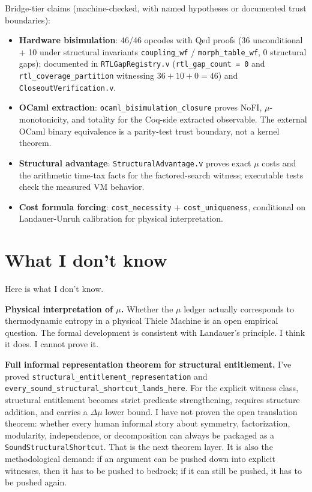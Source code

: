 \documentclass[11pt,a4paper]{article}
\theoremstyle{plain}
\theoremstyle{definition}
\theoremstyle{remark}
\begin{document}
Bridge-tier claims (machine-checked, with named hypotheses or documented trust boundaries):
\begin{itemize}
\item \textbf{Hardware bisimulation}: 46/46 opcodes with Qed proofs (36 unconditional + 10 under structural invariants \texttt{coupling\_wf} / \texttt{morph\_table\_wf}, 0 structural gaps); documented in \texttt{RTLGapRegistry.v} (\texttt{rtl\_gap\_count = 0} and \texttt{rtl\_coverage\_partition} witnessing $36 + 10 + 0 = 46$) and \texttt{CloseoutVerification.v}.
\item \textbf{OCaml extraction}: \texttt{ocaml\_bisimulation\_closure} proves NoFI, $\mu$-monotonicity, and totality for the Coq-side extracted observable. The external OCaml binary equivalence is a parity-test trust boundary, not a kernel theorem.
\item \textbf{Structural advantage}: \texttt{StructuralAdvantage.v} proves exact $\mu$ costs and the arithmetic time-tax facts for the factored-search witness; executable tests check the measured VM behavior.
\item \textbf{Cost formula forcing}: \texttt{cost\_necessity} + \texttt{cost\_uniqueness}, conditional on Landauer-Unruh calibration for physical interpretation.
\end{itemize}

\section{What I don't know}
\label{sec:unknown}

Here is what I don't know.

\textbf{Physical interpretation of $\mu$.} Whether the $\mu$ ledger actually corresponds to thermodynamic entropy in a physical Thiele Machine is an open empirical question. The formal development is consistent with Landauer's principle. I think it does. I cannot prove it.

\textbf{Full informal representation theorem for structural entitlement.} I've proved \texttt{structural\_entitlement\_representation} and \texttt{every\_sound\_structural\_shortcut\_lands\_here}. For the explicit witness class, structural entitlement becomes strict predicate strengthening, requires structure addition, and carries a $\Delta\mu$ lower bound. I have not proven the open translation theorem: whether every human informal story about symmetry, factorization, modularity, independence, or decomposition can always be packaged as a \texttt{SoundStructuralShortcut}. That is the next theorem layer. It is also the methodological demand: if an argument can be pushed down into explicit witnesses, then it has to be pushed to bedrock; if it can still be pushed, it has to be pushed again.
\end{document}
